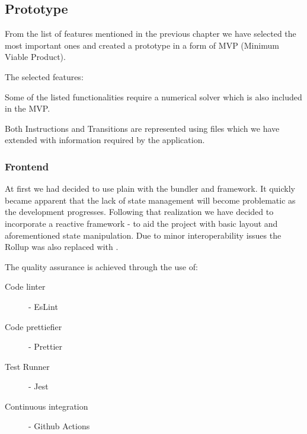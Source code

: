 \subsection{Prototype}

From the list of features mentioned in the previous chapter we have selected the most important ones and created a prototype in a form of MVP (Minimum Viable Product). 

The selected features:

\begin{enumerate}
\end{enumerate}

Some of the listed functionalities require a numerical solver which is also included in the MVP.

Both Instructions and Transitions are represented using  files which we have extended with information required by the application.

\subsubsection{Frontend}

At first we had decided to use plain  with the  bundler and  framework.
It quickly became apparent that the lack of state management will become problematic as the development progresses. Following that realization we have decided to incorporate a reactive framework -  to aid the project with basic layout and aforementioned state manipulation. 
Due to minor interoperability issues the Rollup was also replaced with .

The quality assurance is achieved through the use of:

\begin{description}
\item[Code linter] - EsLint
\item[Code prettiefier] - Prettier
\item[Test Runner] - Jest
\item[Continuous integration] - Github Actions
\end{description}

